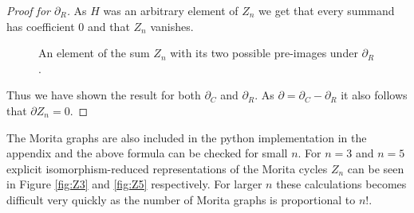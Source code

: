 \begin{proof}[Proof for $\partial_{R}$]
	As $H$ was an arbitrary element of $Z_{n}$ we get that every summand has coefficient $0$ and that $Z_{n}$ vanishes.

	\begin{figure}
		\centering
		\caption{An element of the sum $Z_{n}$ with its two possible pre-images under $\partial_{R}$.}
		\label{fig:MoritaCycleDR}
	\end{figure}
	Thus we have shown the result for both $\partial_{C}$ and $\partial_{R}$. As $\partial = \partial_{C} - \partial_{R}$ it also follows that $\partial Z_{n} = 0$.
\end{proof}

\begin{remark}
	The Morita graphs are also included in the python implementation in the appendix and the above formula can be checked for small $n$.
	For $n=3$ and $n=5$ explicit isomorphism-reduced representations of the Morita cycles $Z_{n}$ can be seen in Figure \ref{fig:Z3} and \ref{fig:Z5} respectively.
	For larger $n$ these calculations becomes difficult very quickly as the number of Morita graphs is proportional to $n!$.
\end{remark}

